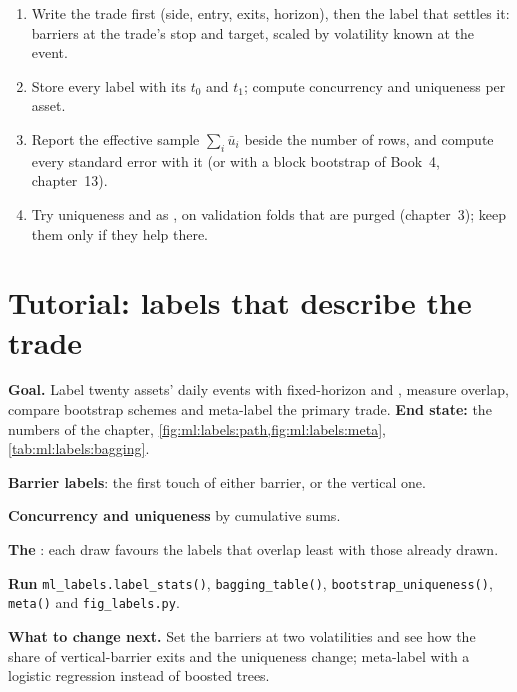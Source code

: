 \begin{method}\label{met:ml:labels:method}
\begin{enumerate}
\item Write the trade first (side, entry, exits, horizon), then the label that settles it: barriers at the trade's
stop and target, scaled by volatility known at the event.
\item Store every label with its $t_0$ and $t_1$; compute concurrency and uniqueness per asset.
\item Report the effective sample $\sum_i\bar u_i$ beside the number of rows, and compute every standard error with it
(or with a block bootstrap of Book~4, chapter~13).
\item Try uniqueness and  as , on validation folds that are purged (chapter~3); keep
them only if they help there.
\end{enumerate}
\end{method}

\section{Tutorial: labels that describe the trade}\label{tut:ml:targets-labels-and-sample-weights:tut}

\begin{tutorial}
\textbf{Goal.} Label twenty assets' daily events with fixed-horizon and , measure overlap, compare
bootstrap schemes and meta-label the primary trade. \textbf{End state:} the numbers of the chapter,
\cref{fig:ml:labels:path,fig:ml:labels:meta}, \cref{tab:ml:labels:bagging}.
\begin{tutsteps}
\item \textbf{Barrier labels}: the first touch of either barrier, or the vertical one.
\label{lst:ml:labels:triple}
\item \textbf{Concurrency and uniqueness} by cumulative sums.
\label{lst:ml:labels:uniq}
\item \textbf{The }: each draw favours the labels that overlap least with those already drawn.
\label{lst:ml:labels:seq}
\item \textbf{Run} \texttt{ml\_labels.label\_stats()}, \texttt{bagging\_table()}, \texttt{bootstrap\_uniqueness()},
\texttt{meta()} and \texttt{fig\_labels.py}.
\end{tutsteps}
\textbf{What to change next.} Set the barriers at two volatilities and see how the share of vertical-barrier exits and
the uniqueness change; meta-label with a logistic regression instead of boosted trees.
\end{tutorial}

